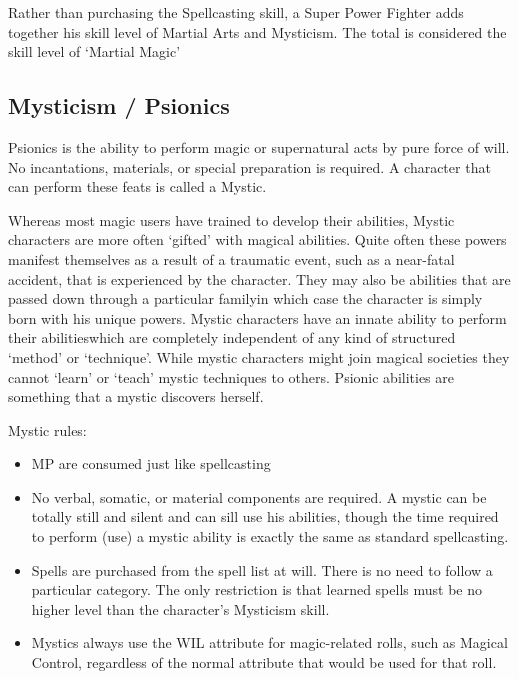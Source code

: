 \documentclass[twoside]{book}
\begin{document}
    {  
      Rather than purchasing the Spellcasting skill, a
               Super Power Fighter adds together his skill level of
               Martial Arts and Mysticism. The total is considered the
               skill level of `Martial Magic' 
    }
  
    

\subsection{Mysticism / Psionics}
    
    {  
      Psionics is the ability to perform magic or
               supernatural acts by pure force of will. No incantations,
               materials, or special preparation is required. A character
               that can perform these feats is called a Mystic. 
    }
  
    {  
      Whereas most magic users have trained to develop
               their abilities, Mystic characters are more often
               `gifted' with magical abilities. Quite often
               these powers manifest themselves as a result of a
               traumatic event, such as a near-fatal accident, that is
               experienced by the character. They may also be abilities
               that are passed down through a particular familyin
               which case the character is simply born with his unique
               powers. Mystic characters have an innate ability to
               perform their abilitieswhich are completely
               independent of any kind of structured `method'
               or `technique'. While mystic characters might
               join magical societies they cannot `learn' or
               `teach' mystic techniques to others. Psionic
               abilities are something that a mystic discovers herself.
               
    }
  
    {  
      Mystic rules: 
    }
  
\begin{itemize}
      
  \item   MP are consumed just like spellcasting 
  \item   No verbal, somatic, or material components are
                 required. A mystic can be totally still and silent and
                 can sill use his abilities, though the time required to
                 perform (use) a mystic ability is exactly the same as
                 standard spellcasting. 
  \item   Spells are purchased from the spell list at will.
                 There is no need to follow a particular category. The
                 only restriction is that learned spells must be no
                 higher level than the character's Mysticism skill.
                 
  \item   Mystics always use the WIL attribute for
                 magic-related rolls, such as Magical Control, regardless
                 of the normal attribute that would be used for that
                 roll. 
\end{itemize}
  
\end{document}
